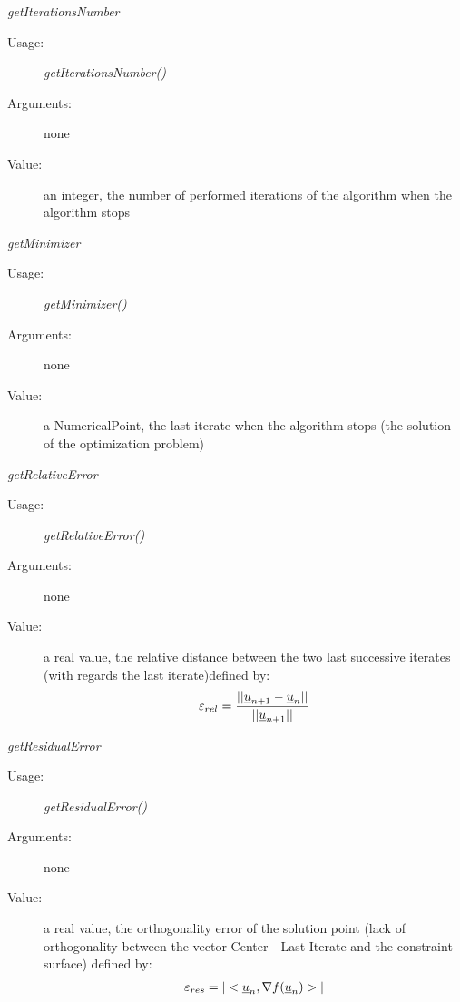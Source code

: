 \begin{description}
\begin{description}
  \item \textit{getIterationsNumber}
    \begin{description}
    \item[Usage:] \textit{getIterationsNumber()}
    \item[Arguments:] none
    \item[Value:]  an integer, the  number of performed iterations of the algorithm when the algorithm stops
    \end{description}
    \bigskip

  \item \textit{getMinimizer}
    \begin{description}
    \item[Usage:] \textit{getMinimizer()}
    \item[Arguments:] none
    \item[Value:]  a NumericalPoint, the last iterate when the algorithm stops (the solution of the optimization problem)
    \end{description}
    \bigskip

  \item \textit{getRelativeError}
    \begin{description}
    \item[Usage:] \textit{getRelativeError()}
    \item[Arguments:] none
    \item[Value:] a real value, the relative distance between the two last successive iterates (with regards the last iterate)defined by:
\begin{align}\label{relError}
\displaystyle \varepsilon_{rel} = \frac{||{\underline{u}}_{n+1}-{\underline{u}}_n||}{||{\underline{u}}_{n+1}||}
\end{align}
    \end{description}
    \bigskip

  \item \textit{getResidualError}
    \begin{description}
    \item[Usage:] \textit{getResidualError()}
    \item[Arguments:] none
    \item[Value:]   a real value, the orthogonality error of the solution point (lack of orthogonality between the vector Center - Last Iterate and the constraint surface) defined by:
\begin{align}\label{resError}
\displaystyle \varepsilon_{res} = |<{\underline{u}}_{n}, \nabla f({\underline{u}}_{n})>|
\end{align}
    \end{description}
    \bigskip


\end{description}
\end{description}

